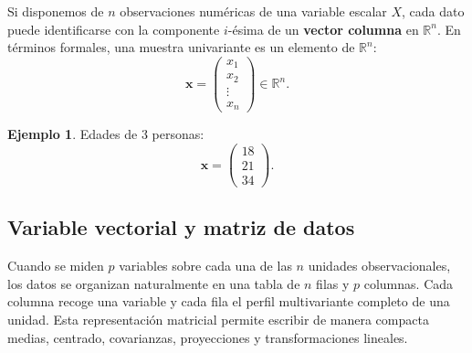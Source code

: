 \documentclass[12pt, a4paper]{article}
\theoremstyle{plain}
\theoremstyle{definition}
\newtheorem{ejemplo}{Ejemplo}[section]
\theoremstyle{remark}
\newcommand{\R}{\mathbb{R}}
\begin{document}
Si disponemos de $n$ observaciones numéricas de una variable escalar $X$, cada
dato puede identificarse con la componente $i$-ésima de un \textbf{vector
columna} en $\R^n$. En términos formales, una muestra univariante es un
elemento de $\R^n$:
\[
  \mathbf{x} = \begin{pmatrix} x_1 \\ x_2 \\ \vdots \\ x_n \end{pmatrix}
  \in \R^n.
\]

\begin{ejemplo}
Edades de 3 personas:
\[
  \mathbf{x} = \begin{pmatrix} 18 \\ 21 \\ 34 \end{pmatrix}.
\]
\end{ejemplo}

\subsection{Variable vectorial y matriz de datos}

Cuando se miden $p$ variables sobre cada una de las $n$ unidades
observacionales, los datos se organizan naturalmente en una tabla de $n$ filas
y $p$ columnas. Cada columna recoge una variable y cada fila el perfil
multivariante completo de una unidad. Esta representación matricial permite
escribir de manera compacta medias, centrado, covarianzas, proyecciones y
transformaciones lineales.
\end{document}
